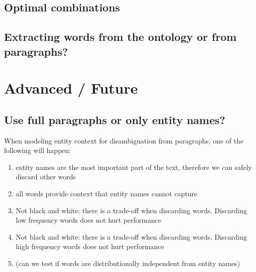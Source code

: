 \documentclass[10pt,a4paper]{article}
\newcommand{\todo}[1]{{\color{red}\textsf{\textbf{TODO}}: #1}}
\begin{document}

\subsection{Optimal combinations}




\subsection{Extracting words from the ontology or from paragraphs?}


\section{Advanced / Future}

\subsection{Use full paragraphs or only entity names?}

When modeling entity context for disambiguation from paragraphs, one of the following will happen:
\begin{enumerate}
\item entity names are the most important part of the text, therefore we can safely discard other words 
\item all words provide context that entity names cannot capture
\item Not black and white: there is a trade-off when discarding words. Discarding low frequency words does not hurt performance
\item Not black and white: there is a trade-off when discarding words. Discarding high frequency words does not hurt performance
\item (can we test if words are distributionally independent from entity names)
\end{enumerate}
\end{document}
